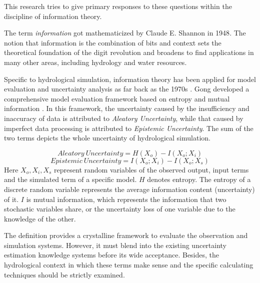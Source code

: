 \documentclass[review]{elsarticle}
\begin{document}
This research tries to give primary responses to these questions within the discipline of information theory.



The term \emph{information} got mathematicized  by Claude E. Shannon in 1948\citep{shannon2001mathematical}. The notion that information is the combination of bits and context\citep{bryant2003computer} sets the theoretical foundation of the digit revolution and   broadens to find applications in many other areas, including hydrology and water resources\citep{singh1997use,singh2000entropy,singh2013entropy}. 
 

Specific to hydrological simulation,
information theory has been applied for model evaluation and
uncertainty analysis as far back as the 1970s \citep{amorocho1973entropy,chapman1986entropy,abebe2003managing,pokhrel2010use,weijs2010hydrological,weijs2011accounting}
.
Gong developed a comprehensive model evaluation framework based on  entropy  and  mutual information  \citep{gong2013estimating} . In this framework, the uncertainty caused by the insufficiency and inaccuracy of data is attributed to \emph{Aleatory Uncertainty}, while that caused by imperfect data processing is attributed to \emph{Epistemic Uncertainty}. The sum of the two terms depicts the whole uncertainty of hydrological simulation.

\begin{equation}\label{AU}
Aleatory~Uncertainty= H(X_{o})-I(X_{o};X_{i})
\end{equation}
\begin{equation}\label{EU}
Epistemic~Uncertainty=I(X_{o};X_{i})-I(X_{o};X_{s})
\end{equation}
Here $X_o,X_i,X_s$ represent random variables of the observed output, input terms and the simulated term of a specific model. $H$ denotes entropy. The entropy of a discrete random variable represents the average information content (uncertainty) of it. $I$ is  mutual information, which represents the  information that two stochastic variables share, or the uncertainty loss of one variable due to the knowledge of the other.  

The definition provides a crystalline framework to evaluate the observation and simulation systems. However, it must blend into the existing uncertainty estimation knowledge systems before its wide  acceptance. Besides, the hydrological context in which these terms make sense and the specific calculating techniques should be strictly examined. 
\end{document}
